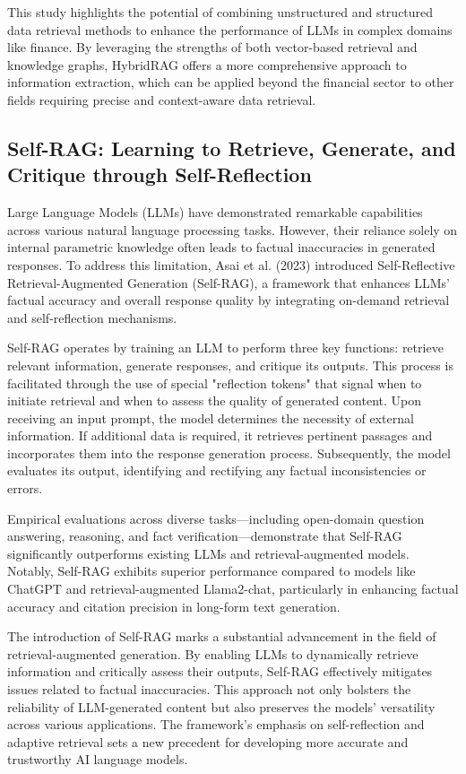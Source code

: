 This study highlights the potential of combining unstructured and structured data retrieval methods to enhance the performance of LLMs in complex domains like finance. By leveraging the strengths of both vector-based retrieval and knowledge graphs, HybridRAG offers a more comprehensive approach to information extraction, which can be applied beyond the financial sector to other fields requiring precise and context-aware data retrieval.

\subsection{Self-RAG: Learning to Retrieve, Generate, and Critique through Self-Reflection}

Large Language Models (LLMs) have demonstrated remarkable capabilities across various natural language processing tasks. However, their reliance solely on internal parametric knowledge often leads to factual inaccuracies in generated responses. To address this limitation, Asai et al. (2023) introduced Self-Reflective Retrieval-Augmented Generation (Self-RAG), a framework that enhances LLMs' factual accuracy and overall response quality by integrating on-demand retrieval and self-reflection mechanisms.

Self-RAG operates by training an LLM to perform three key functions: retrieve relevant information, generate responses, and critique its outputs. This process is facilitated through the use of special "reflection tokens" that signal when to initiate retrieval and when to assess the quality of generated content. Upon receiving an input prompt, the model determines the necessity of external information. If additional data is required, it retrieves pertinent passages and incorporates them into the response generation process. Subsequently, the model evaluates its output, identifying and rectifying any factual inconsistencies or errors.

Empirical evaluations across diverse tasks—including open-domain question answering, reasoning, and fact verification—demonstrate that Self-RAG significantly outperforms existing LLMs and retrieval-augmented models. Notably, Self-RAG exhibits superior performance compared to models like ChatGPT and retrieval-augmented Llama2-chat, particularly in enhancing factual accuracy and citation precision in long-form text generation.

The introduction of Self-RAG marks a substantial advancement in the field of retrieval-augmented generation. By enabling LLMs to dynamically retrieve information and critically assess their outputs, Self-RAG effectively mitigates issues related to factual inaccuracies. This approach not only bolsters the reliability of LLM-generated content but also preserves the models' versatility across various applications. The framework's emphasis on self-reflection and adaptive retrieval sets a new precedent for developing more accurate and trustworthy AI language models.

